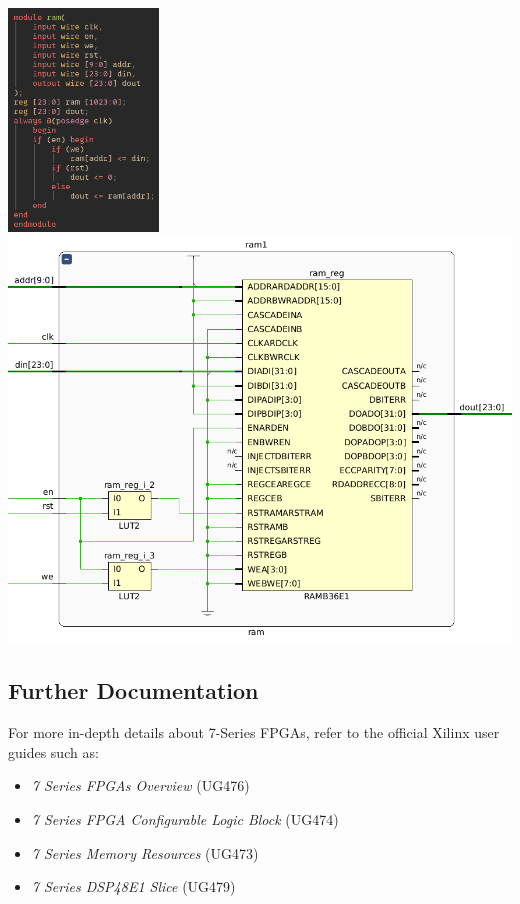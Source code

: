 \documentclass{article}
\begin{document}
\begin{multicols}{2}
        {
            \centering
            \includegraphics[valign=c, width=4.0cm]{figures/bram_synthesis.png}
            \includegraphics[valign=c, width=\columnwidth]{figures/bram_edif.png}
            \label{fig:bram_synthesis}
        }

    \subsection{Further Documentation}

    For more in-depth details about 7-Series FPGAs, refer to the official Xilinx user guides such as:
    \begin{itemize}
        \item \emph{7 Series FPGAs Overview} (UG476)
        \item \emph{7 Series FPGA Configurable Logic Block} (UG474)
        \item \emph{7 Series Memory Resources} (UG473)
        \item \emph{7 Series DSP48E1 Slice} (UG479)
    \end{itemize}


\end{multicols}
\end{document}
